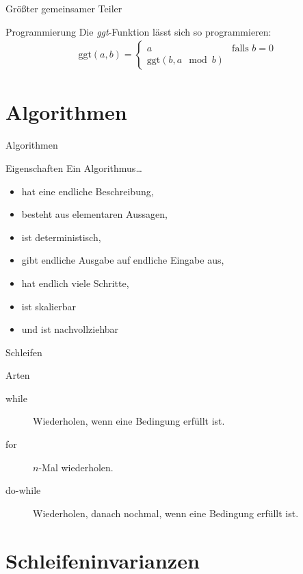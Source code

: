 \documentclass[18pt]{beamer}
\begin{document}
\begin{frame}{Größter gemeinsamer Teiler}
    \begin{exampleblock}{Programmierung}
        Die \emph{ggt}-Funktion lässt sich so programmieren:
        \begin{align*}
            \mathrm{ggt}\left( a, b\right) = \begin{cases} a &\text{falls } b = 0 \\ \mathrm{ggt}\left( b, a\mod b\right)& \end{cases}
        \end{align*}
    \end{exampleblock}
\end{frame}

\section{Algorithmen}

\begin{frame}{Algorithmen}
    \begin{block}{Eigenschaften}
        Ein Algorithmus\dots
        \begin{itemize}
            \item hat eine endliche Beschreibung, 
                \pause
            \item besteht aus elementaren Aussagen,
                \pause
            \item ist deterministisch,
                \pause
            \item gibt endliche Ausgabe auf endliche Eingabe aus,
                \pause
            \item hat endlich viele Schritte,
                \pause
            \item ist skalierbar
                \pause
            \item und ist nachvollziehbar
        \end{itemize}
    \end{block}
\end{frame}

\begin{frame}{Schleifen}
    \begin{block}{Arten}
        \begin{description}
            \item[while] Wiederholen, wenn eine Bedingung erfüllt ist.
                \pause
            \item[for] $n$-Mal wiederholen.
                \pause
            \item[do-while] Wiederholen, danach nochmal, wenn eine Bedingung erfüllt ist.
        \end{description}
    \end{block}
\end{frame}

\section{Schleifeninvarianzen}
\end{document}
